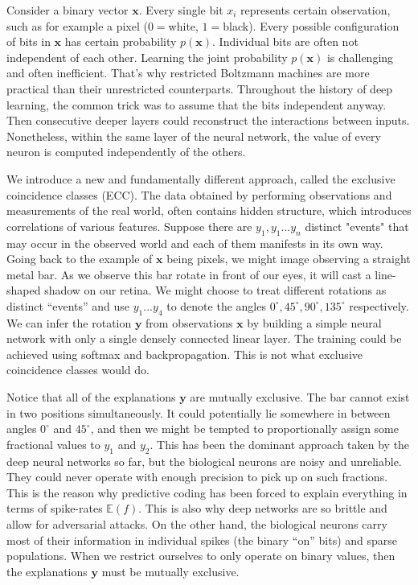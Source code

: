 \documentclass[12pt]{article}
\begin{document}
Consider a binary vector $\boldsymbol{x}$. Every single bit $x_i$ represents certain observation, such as for example a pixel ($0=$white, $1=$black). Every possible configuration of bits in $\boldsymbol{x}$ has certain probability $p(\boldsymbol{x})$. Individual bits are often not independent of each other. Learning the joint probability $p(\boldsymbol{x})$ is challenging and often inefficient. That's why restricted Boltzmann machines are more practical than their unrestricted counterparts. Throughout the history of deep learning, the common trick was to assume that the bits independent anyway. Then consecutive deeper layers could reconstruct the interactions between inputs. Nonetheless, within the same layer of the neural network, the value of every neuron is computed independently of the others. 

We introduce a new and fundamentally different approach, called the exclusive coincidence classes (ECC). The data obtained by performing observations and measurements of the real world, often contains hidden structure, which introduces correlations of various features. Suppose there are $y_1,y_1...y_n$ distinct "events"
that may occur in the observed world and each of them manifests in its own way.
Going back to the example of $\boldsymbol{x}$ being pixels, we might image observing a straight metal bar. As we observe this bar rotate in front of our eyes, it will cast a line-shaped shadow on our retina. We might choose to treat different  rotations as distinct ``events'' and use $y_1...y_4$ to denote the angles $0^{\circ},45^{\circ},90^{\circ},135^{\circ}$ respectively. We can infer the rotation $\boldsymbol{y}$ from observations $\boldsymbol{x}$ by building a simple neural network with only a single densely connected linear layer. The training could be achieved using softmax and backpropagation. This is not what exclusive coincidence classes would do. 

Notice that all of the explanations $\boldsymbol{y}$ are mutually exclusive.
The bar cannot exist in two positions simultaneously. It could potentially lie somewhere in between angles $0^{\circ}$ and $45^{\circ}$, and then we might be tempted to proportionally assign some fractional values to $y_1$ and $y_2$. This  has been the dominant approach taken by the deep neural networks so far, but the biological neurons are noisy and unreliable. They could never operate with enough precision to pick up on such fractions. This is the reason why predictive coding has been forced to explain everything in terms of spike-rates $\mathbb{E}(f)$. This is also why deep networks are so brittle and allow for adversarial attacks. On the other hand, the biological neurons carry most of their information in individual spikes (the binary ``on'' bits) and sparse populations. When we restrict ourselves to only operate on binary values, then the explanations $\boldsymbol{y}$ must be mutually exclusive.
\end{document}
